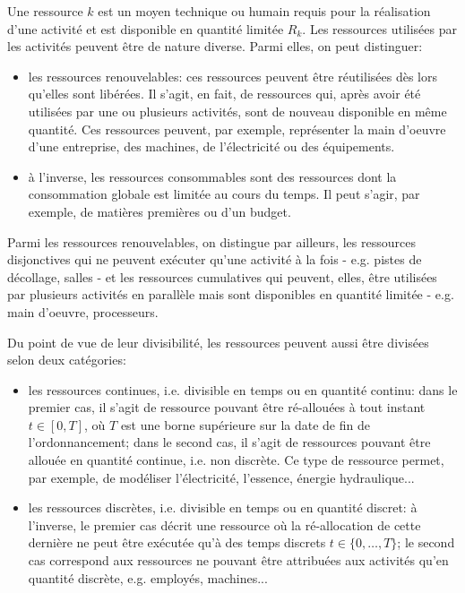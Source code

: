 Une ressource $k$ est un moyen technique ou humain requis pour la
réalisation d'une activité et est disponible en quantité limitée $R_k$. 
Les ressources utilisées par les activités peuvent être de nature
diverse. Parmi elles, on peut distinguer: 
\begin{itemize}
\item les ressources renouvelables: ces ressources peuvent être
réutilisées dès lors qu'elles sont libérées. Il s'agit, en fait, de
ressources qui, après avoir été utilisées par une ou plusieurs
activités, sont de nouveau disponible en même quantité. Ces ressources
peuvent, par exemple, représenter la main d'oeuvre d'une entreprise,
des machines, de l'électricité ou des équipements.
\item à l'inverse, les ressources consommables sont des ressources
dont la consommation globale est limitée au cours du temps. Il peut
s'agir, par exemple, de matières premières ou d'un budget.
\end{itemize}

Parmi les ressources renouvelables, on distingue par ailleurs, les
ressources disjonctives qui ne peuvent exécuter qu'une activité à la
fois - e.g. pistes de décollage, salles - et les ressources cumulatives
qui peuvent, elles,  être utilisées par plusieurs activités en
parallèle mais sont disponibles en quantité limitée - e.g. main d'oeuvre,
processeurs.


Du point de vue de leur divisibilité, les ressources peuvent aussi
être divisées selon deux catégories: 
\begin{itemize}
\item les ressources continues, i.e. divisible en temps ou en
  quantité continu: dans le premier cas, il s'agit de ressource
  pouvant être ré-allouées à tout instant $t \in [0,T]$, où $T$ est une
  borne supérieure sur la date de fin de l'ordonnancement; dans le
  second cas, il s'agit de ressources pouvant être allouée en quantité
  continue, i.e. non discrète. Ce type de ressource permet, par
  exemple, de modéliser l'électricité, l'essence, énergie hydraulique...
\item les ressources discrètes, i.e. divisible en temps ou en quantité
  discret: à l'inverse, le premier cas décrit une ressource où la
  ré-allocation de cette dernière ne peut être 
  exécutée qu'à des temps discrets $t \in \{0,\dots,T\}$; le second
  cas correspond aux ressources ne pouvant être attribuées aux
  activités qu'en quantité discrète,  e.g. employés, machines...
\end{itemize}


